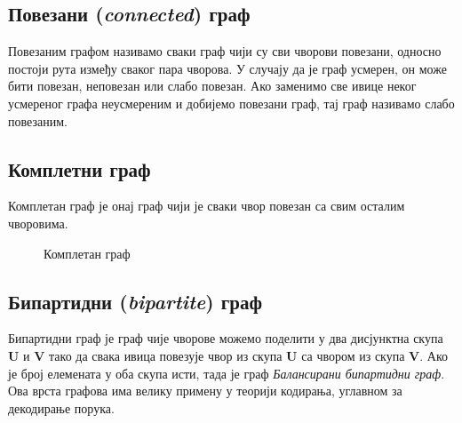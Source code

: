 \documentclass[11pt, oneside, a4paper]{article}
\begin{document}
\subsection{Повезани (\textit{connected}) граф}
Повезаним графом називамо сваки граф чији су сви чворови повезани, односно постоји рута између сваког пара чворова. У случају да је граф усмерен, он може бити повезан, неповезан или слабо повезан. Ако заменимо све ивице неког усмереног графа неусмереним и добијемо повезани граф, тај граф називамо слабо повезаним. 
\subsection{Комплетни граф}
Комплетан граф је онај граф чији је сваки чвор повезан са свим осталим чворовима.
\begin{figure}[h]
    \centering

    \caption{Комплетан граф}
    \label{fig:my_label}
\end{figure}
\subsection{Бипартидни (\textit{bipartite}) граф}
Бипартидни граф је граф чије чворове можемо поделити у два дисјунктна скупа \textbf{U} и \textbf{V} тако да свака ивица повезује чвор из скупа \textbf{U} са чвором из скупа \textbf{V}. Ако је број елемената у оба скупа исти, тада је граф \textit{Балансирани бипартидни граф}. Ова врста графова има велику примену у теорији кодирања, углавном за декодирање порука.
\end{document}
